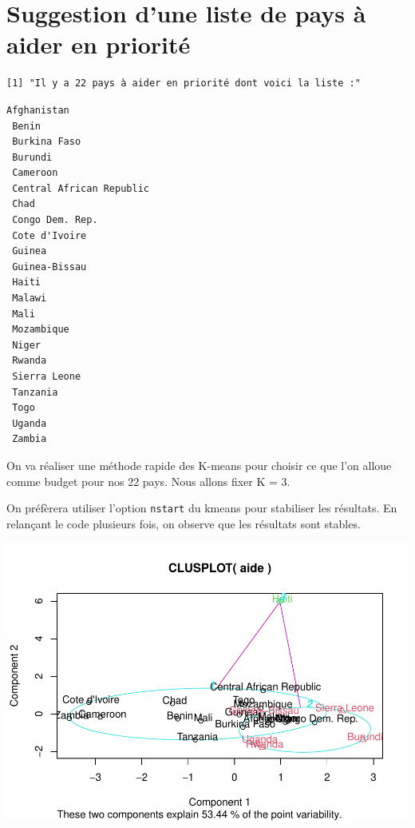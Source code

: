 \documentclass[
]{article}
\newenvironment{Shaded}{}{}
\newcommand{\AttributeTok}[1]{#1}
\newcommand{\DecValTok}[1]{#1}
\newcommand{\FunctionTok}[1]{#1}
\newcommand{\NormalTok}[1]{#1}
\newcommand{\OtherTok}[1]{\textcolor[rgb]{1.00,0.25,0.00}{#1}}
\newcommand{\SpecialCharTok}[1]{\textcolor[rgb]{0.00,0.50,0.50}{#1}}
\begin{document}
\hypertarget{suggestion-dune-liste-de-pays-uxe0-aider-en-priorituxe9}{%
\section{Suggestion d'une liste de pays à aider en
priorité}\label{suggestion-dune-liste-de-pays-uxe0-aider-en-priorituxe9}}

\begin{verbatim}
[1] "Il y a 22 pays à aider en priorité dont voici la liste :"
\end{verbatim}

\begin{verbatim}
Afghanistan 
 Benin 
 Burkina Faso 
 Burundi 
 Cameroon 
 Central African Republic 
 Chad 
 Congo Dem. Rep. 
 Cote d'Ivoire 
 Guinea 
 Guinea-Bissau 
 Haiti 
 Malawi 
 Mali 
 Mozambique 
 Niger 
 Rwanda 
 Sierra Leone 
 Tanzania 
 Togo 
 Uganda 
 Zambia 
\end{verbatim}

On va réaliser une méthode rapide des K-means pour choisir ce que l'on
alloue comme budget pour nos 22 pays. Nous allons fixer K = 3.

On préfèrera utiliser l'option \texttt{nstart} du kmeans pour stabiliser
les résultats. En relançant le code plusieurs fois, on observe que les
résultats sont stables.

\begin{Shaded}
\end{Shaded}

\includegraphics{Projet_files/figure-latex/unnamed-chunk-44-1.pdf}
\end{document}
